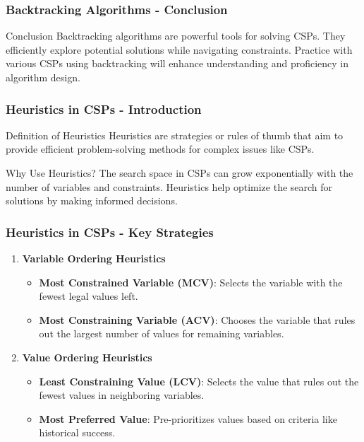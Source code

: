 \documentclass[aspectratio=169]{beamer}
\begin{document}
\begin{frame}[fragile]
    \frametitle{Backtracking Algorithms - Conclusion}
    \begin{block}{Conclusion}
        Backtracking algorithms are powerful tools for solving CSPs. They efficiently explore potential solutions while navigating constraints. 
        Practice with various CSPs using backtracking will enhance understanding and proficiency in algorithm design.
    \end{block}
\end{frame}

\begin{frame}[fragile]
    \frametitle{Heuristics in CSPs - Introduction}
    \begin{block}{Definition of Heuristics}
        Heuristics are strategies or rules of thumb that aim to provide efficient problem-solving methods for complex issues like CSPs.
    \end{block}

    \begin{block}{Why Use Heuristics?}
        The search space in CSPs can grow exponentially with the number of variables and constraints. Heuristics help optimize the search for solutions by making informed decisions.
    \end{block}
\end{frame}

\begin{frame}[fragile]
    \frametitle{Heuristics in CSPs - Key Strategies}
    \begin{enumerate}
        \item \textbf{Variable Ordering Heuristics}
            \begin{itemize}
                \item \textbf{Most Constrained Variable (MCV)}: Selects the variable with the fewest legal values left.
                \item \textbf{Most Constraining Variable (ACV)}: Chooses the variable that rules out the largest number of values for remaining variables.
            \end{itemize}
        
        \item \textbf{Value Ordering Heuristics}
            \begin{itemize}
                \item \textbf{Least Constraining Value (LCV)}: Selects the value that rules out the fewest values in neighboring variables.
                \item \textbf{Most Preferred Value}: Pre-prioritizes values based on criteria like historical success.
            \end{itemize}
    \end{enumerate}
\end{frame}
\end{document}
